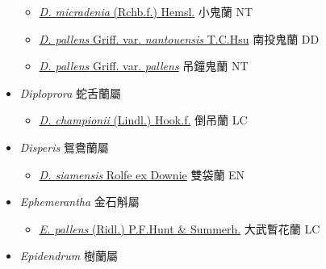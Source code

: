 \begin{itemize}
  \begin{itemize}
        \item[] \href{http://www.theplantlist.org/tpl1.1/search?q=Didymoplexis+micradenia}{\textit{D. micradenia} (Rchb.f.) Hemsl.}   小鬼蘭   NT
        \item[] \href{http://www.theplantlist.org/tpl1.1/search?q=Didymoplexis+pallens+var.+nantouensis}{\textit{D. pallens} Griff. var. \textit{nantouensis} T.C.Hsu}   南投鬼蘭   DD
        \item[] \href{http://www.theplantlist.org/tpl1.1/search?q=Didymoplexis+pallens+var.+pallens}{\textit{D. pallens} Griff. var. \textit{pallens}}   吊鐘鬼蘭   NT
  \end{itemize}
 \item[] \textit{Diploprora} 蛇舌蘭屬
                                
  \begin{itemize}
        \item[] \href{http://www.theplantlist.org/tpl1.1/search?q=Diploprora+championii}{\textit{D. championii} (Lindl.) Hook.f.}   倒吊蘭   LC
  \end{itemize}
 \item[] \textit{Disperis} 鴛鴦蘭屬
                                
  \begin{itemize}
        \item[] \href{http://www.theplantlist.org/tpl1.1/search?q=Disperis+siamensis}{\textit{D. siamensis} Rolfe ex Downie}   雙袋蘭   EN
  \end{itemize}
 \item[] \textit{Ephemerantha} 金石斛屬
                                
  \begin{itemize}
        \item[] \href{http://www.theplantlist.org/tpl1.1/search?q=Ephemerantha+pallens}{\textit{E. pallens} (Ridl.) P.F.Hunt \& Summerh.}   大武暫花蘭   LC
  \end{itemize}
 \item[] \textit{Epidendrum} 樹蘭屬
                                

\end{itemize}
